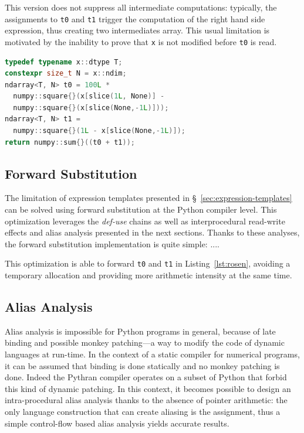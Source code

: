 \documentclass[10pt, preprint]{sigplanconf}
\begin{document}
This version does not suppress all intermediate computations: typically, the
assignments to \texttt{t0} and \texttt{t1} trigger the computation of the right
hand side expression, thus creating two intermediates array. This usual
limitation is motivated by the inability to prove that \texttt{x} is not
modified before \texttt{t0} is read.

\begin{lstlisting}[language=c++,
  caption={C++11 translated version of Python version for the Rosenbrock
           kernel.},
  label={lst:rosen-cxx},
  breaklines=true,
  basicstyle=\small]
typedef typename x::dtype T;
constexpr size_t N = x::ndim;
ndarray<T, N> t0 = 100L *
  numpy::square{}(x[slice(1L, None)] -
  numpy::square{}(x[slice(None,-1L)]));
ndarray<T, N> t1 =
  numpy::square{}(1L - x[slice(None,-1L)]);
return numpy::sum{}((t0 + t1));
\end{lstlisting}


\subsection{Forward Substitution}
\label{sec:fs}

The limitation of expression templates presented in
\S~\ref{sec:expression-templates} can be solved using forward substitution at
the Python compiler level. This optimization leverages the
\textit{def-use} chains as well as interprocedural read-write
effects and alias analysis presented in the next sections.
Thanks to these analyses, the forward substitution implementation is quite
simple: ....

This optimization is able to forward \texttt{t0} and \texttt{t1} in
Listing~\ref{lst:rosen}, avoiding a temporary allocation and providing more
arithmetic intensity at the same time.


\subsection{Alias Analysis}
\label{sec:alias}

Alias analysis is impossible for Python programs in general, because of late
binding and possible monkey patching---a way to modify the code of dynamic
languages at run-time. In the context of a static compiler for
numerical programs, it can be assumed that binding is done statically and no
monkey patching is done. Indeed the Pythran compiler operates on a subset of
Python that forbid this kind of dynamic patching.
In this context, it becomes possible to design an intra-procedural alias
analysis thanks to the absence of pointer arithmetic:
the only language construction that can create aliasing is the assignment, thus
a simple control-flow based alias analysis yields accurate results.
\end{document}
